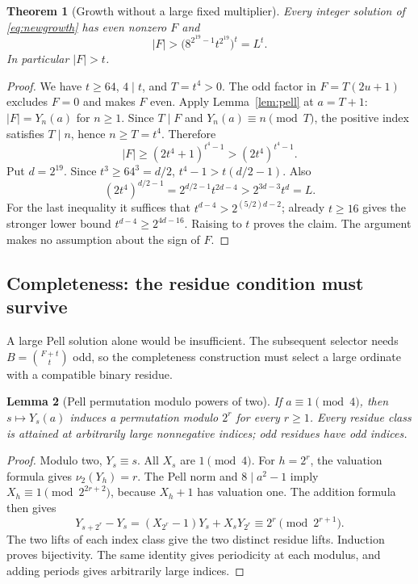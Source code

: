 \documentclass[10pt,letterpaper]{article}
\newtheorem{theorem}{Theorem}[section]
\newtheorem{lemma}[theorem]{Lemma}
\theoremstyle{remark}\newtheorem{remark}[theorem]{Remark}
\newcommand{\vp}{\nu_2}
\begin{document}
\begin{theorem}[Growth without a large fixed multiplier]\label{thm:growth}
Every integer solution of \eqref{eq:newgrowth} has even nonzero $F$ and
\[
 |F|>\bigl(8^{2^{19}-1}t^{2^{19}}\bigr)^t=L^t.
\]
In particular $|F|>t$.
\end{theorem}
\begin{proof}
We have $t\ge64$, $4\mid t$, and $T=t^4>0$.
The odd factor in $F=T(2u+1)$ excludes $F=0$ and makes $F$ even.
Apply Lemma~\ref{lem:pell} at $a=T+1$: $|F|=Y_n(a)$ for $n\ge1$.
Since $T\mid F$ and $Y_n(a)\equiv n\pmod T$, the positive index
satisfies $T\mid n$, hence $n\ge T=t^4$. Therefore
\[
 |F|\ge(2t^4+1)^{t^4-1}>(2t^4)^{t^4-1}.
\]
Put $d=2^{19}$. Since $t^3\ge64^3=d/2$,
$t^4-1>t(d/2-1)$. Also
\[
 (2t^4)^{d/2-1}=2^{d/2-1}t^{2d-4}
   >2^{3d-3}t^d=L.
\]
For the last inequality it suffices that
$t^{d-4}>2^{(5/2)d-2}$; already $t\ge16$ gives the stronger lower
bound $t^{d-4}\ge2^{4d-16}$. Raising to $t$ proves the claim.
The argument makes no assumption about the sign of $F$.
\end{proof}

\subsection{Completeness: the residue condition must survive}

A large Pell solution alone would be insufficient. The subsequent selector
needs $B=\binom{F+t}{t}$ odd, so the completeness construction must select
a large ordinate with a compatible binary residue.

\begin{lemma}[Pell permutation modulo powers of two]\label{lem:permutation}
If $a\equiv1\pmod4$, then $s\mapsto Y_s(a)$ induces a permutation
modulo $2^r$ for every $r\ge1$. Every residue class is attained at
arbitrarily large nonnegative indices; odd residues have odd indices.
\end{lemma}
\begin{proof}
Modulo two, $Y_s\equiv s$. All $X_s$ are $1\pmod4$.
For $h=2^r$, the valuation formula gives $\vp(Y_h)=r$.
The Pell norm and $8\mid a^2-1$ imply
$X_h\equiv1\pmod{2^{2r+2}}$, because $X_h+1$ has valuation one.
The addition formula then gives
\[
 Y_{s+2^r}-Y_s=(X_{2^r}-1)Y_s+X_sY_{2^r}
       \equiv2^r\pmod{2^{r+1}}.
\]
The two lifts of each index class give the two distinct residue lifts.
Induction proves bijectivity. The same identity gives periodicity at each
modulus, and adding periods gives arbitrarily large indices.
\end{proof}
\end{document}
